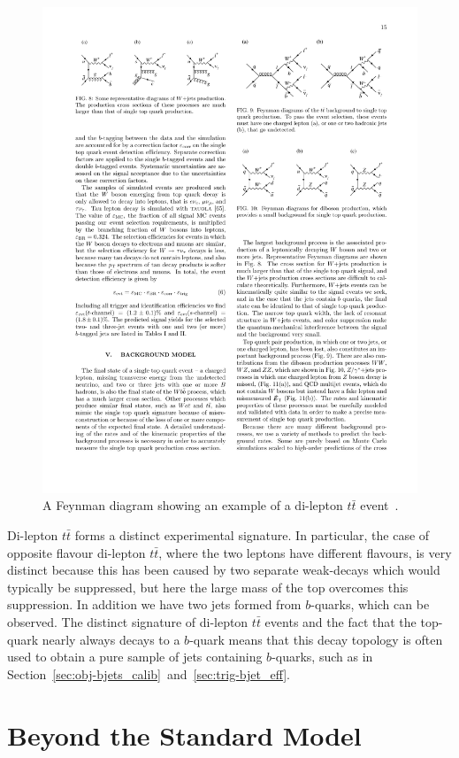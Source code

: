 \begin{figure}[!hbt]
  \begin{center}
    \includegraphics[width=0.7\linewidth, angle=0]{figs/Theory/ttbar.pdf}
  \end{center}
  \caption[A Feynman diagram showing an example of a di-lepton $t\bar{t}$ event.]
  {A Feynman diagram showing an example of a di-lepton $t\bar{t}$ event~\cite{theo-ttbar_feyn}.}
  \label{fig:theo-ttbar}
\end{figure}

Di-lepton $t\bar{t}$ forms a distinct experimental signature.
In particular, the case of opposite flavour di-lepton $t\bar{t}$, where the two leptons have different flavours, is very distinct
because this has been caused by two separate weak-decays which would typically be suppressed,
but here the large mass of the top overcomes this suppression.
In addition we have two jets formed from $b$-quarks, which can be observed.
The distinct signature of di-lepton $t\bar{t}$ events and the fact that the top-quark nearly always decays to a $b$-quark
means that this decay topology is often used to obtain a pure sample of jets containing $b$-quarks,
such as in Section~\ref{sec:obj-bjets_calib}~and~\ref{sec:trig-bjet_eff}. 

\clearpage
\section{Beyond the Standard Model}
\label{sec:theo-bsm}

